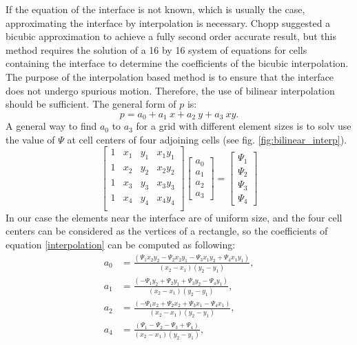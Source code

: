 \documentclass[review]{elsarticle}
\begin{document}
If the equation of the interface is not known, which is usually the case, approximating the interface by interpolation is necessary. Chopp suggested a bicubic approximation \cite{Chopp2001} to achieve a fully second order accurate result, but this method requires the solution of a 16 by 16 system of equations for cells containing the interface to determine the coefficients of the bicubic interpolation. 
The purpose of the interpolation based method is to ensure that the interface does not undergo spurious motion.
Therefore, the use of bilinear interpolation should be sufficient. The general form of $p$ is:
\begin{equation}\label{interpolation}
p=a_0+a_1 \ x+ a_2 \ y+ a_3 \ xy.
\end{equation} 
A general way to find $a_0$ to $a_3$ for a grid with different element sizes is to solv%
use the value of $\varPsi$  
at cell centers of four adjoining cells (see fig. \ref{fig:bilinear_interp}).
\begin{equation}
\label{bilin_system}
\begin{bmatrix}
    1 & x_1 & y_1 & x_1 y_1 \\
    1 & x_2 & y_2 & x_2 y_2 \\
    1 & x_3 & y_3 & x_3 y_3 \\
    1 & x_4 & y_4 & x_4 y_4 \\
\end{bmatrix}
\begin{bmatrix}
    a_0 \\
    a_1 \\
    a_2 \\
    a_3
\end{bmatrix}
=
\begin{bmatrix}
    \varPsi_1  \\
   \varPsi_2  \\
    \varPsi_3  \\
     \varPsi_4  
\end{bmatrix}
\end{equation} 
In our case the elements near the interface are of uniform size, and the four cell centers can be considered as the vertices of a rectangle, so the coefficients of 
equation \eqref{interpolation} can be computed as following:
\begin{subequations}
\begin{align}
a_0&=\frac{(\varPsi_1 x_2 y_2 - \varPsi_2 x_2 y_1 - \varPsi_3 x_1 y_2 + \varPsi_4 x_1 y_1)}{(x_2-x_1)(y_2-y_1)}, \\ 
a_1&=\frac{(-\varPsi_1 y_2 + \varPsi_2 y_1 + \varPsi_3 y_2 - \varPsi_4 y_1)}{(x_2-x_1)(y_2-y_1)},\\
a_2&=\frac{(-\varPsi_1 x_2 + \varPsi_2 x_2 + \varPsi_3 x_1 - \varPsi_4 x_1 )}{(x_2-x_1)(y_2-y_1)}, \\ 
a_4&=\frac{(\varPsi_1 - \varPsi_2 - \varPsi_3 + \varPsi_4)}{(x_2-x_1)(y_2-y_1)}, 
\end{align}
\end{subequations}
\end{document}
